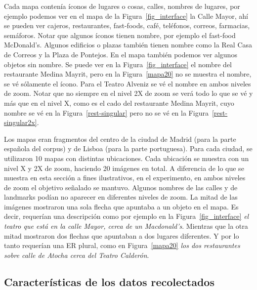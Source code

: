 Cada mapa conten\'ia \'iconos de lugares o cosas, calles, nombres de lugares, por ejemplo podemos ver en el mapa de la Figura~\ref{fig_interface} la Calle Mayor, ah\'i se pueden ver cajeros, restaurantes, fast-foods, caf\'e, tel\'efonos, correos, farmacias, sem\'aforos. Notar que algunos \'iconos tienen nombre, por ejemplo el fast-food McDonald's. Algunos edificios o plazas tambi\'en tienen nombre como la Real Casa de Correos y la Plaza de Pontejos. En el mapa tambi\'en podemos ver algunos objetos sin nombre.
Se puede ver en la Figura~\ref{fig_interface} el nombre del restaurante Medina Mayrit, pero en la Figura~\ref{mapa20} no se muestra el nombre, se v\'e s\'olamente el \'icono. Para el Teatro Alveniz se v\'e el nombre en ambos niveles de zoom. Notar que no siempre en el nivel 2X de zoom se ver\'a todo lo que se v\'e y m\'as que en el nivel X, como es el cado del restaurante Medina Mayrit, cuyo nombre se v\'e en la Figura~\ref{rest-singular} pero no se v\'e en la Figura~\ref{rest-singular2x}. 

Los mapas eran fragmentos del centro de la ciudad de Madrid (para la parte espa\~nola del corpus) y de Lisboa (para la parte portuguesa).
Para cada ciudad, se utilizaron 10 mapas con distintas ubicaciones. Cada ubicaci\'on se muestra con un nivel X y 2X de zoom, haciendo 20 im\'agenes en total. 
A diferencia de lo que se muestra en esta secci\'on a fines ilustrativos, en el experimento, en ambos niveles de zoom el objetivo se\~{n}alado se mantuvo. Algunos nombres de las calles y de landmarks pod\'{i}an no aparecer en diferentes niveles de zoom.
La mitad de las im\'agenes mostraron una sola flecha que apuntaba a un objeto en el mapa. Es decir, requer\'{i}an una descripci\'on como por ejemplo en la Figura~\ref{fig_interface} {\it el teatro que est\'a en la calle Mayor, cerca de un Macdonald's}. Mientras que la otra mitad mostraron dos flechas que apuntaban a dos lugares diferentes. Y por lo tanto requer\'ian una ER plural, como en Figura~\ref{mapa20} {\it los dos restaurantes sobre calle de Atocha cerca del Teatro Calder\'on}.


\subsection{Caracter\'isticas de los datos recolectados}
\label{sec:datos_recolectados}


